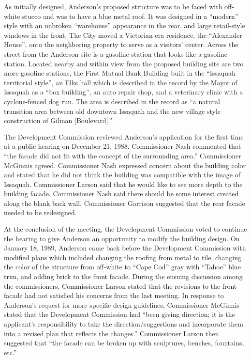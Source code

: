 As initially designed, Anderson's proposed structure was to be faced with
off-white stucco and was to have a blue metal roof. It was designed in a
``modern'' style with an unbroken ``warehouse'' appearance in the rear, and
large retail-style windows in the front. The City moved a Victorian era
residence, the ``Alexander House'', onto the neighboring property to serve as a
visitors' center. Across the street from the Anderson site is a gasoline station
that looks like a gasoline station. Located nearby and within view from the
proposed building site are two more gasoline stations, the First Mutual Bank
Building built in the ``Issaquah territorial style'', an Elks hall which is
described in the record by the Mayor of Issaquah as a ``box building'', an auto
repair shop, and a veterinary clinic with a cyclone-fenced dog run. The area is
described in the record as ``a natural transition area between old downtown
Issaquah and the new village style construction of Gilman [Boulevard].''

The Development Commission reviewed Anderson's application for the first time
at a public hearing on December 21, 1988. Commissioner Nash commented that ``the
facade did not fit with the concept of the surrounding area.'' Commissioner
McGinnis agreed. Commissioner Nash expressed concern about the building color
and stated that he did not think the building was compatible with the image of
Issaquah. Commissioner Larson said that he would like to see more depth to the
building facade. Commissioner Nash said there should be some interest created
along the blank back wall. Commissioner Garrison suggested that the rear facade
needed to be redesigned.

At the conclusion of the meeting, the Development Commission voted to continue
the hearing to give Anderson an opportunity to modify the building design. On
January 18, 1989, Anderson came back before the Development Commission with
modified plans which included changing the roofing from metal to tile, changing
the color of the structure from off-white to ``Cape Cod'' gray with
``Tahoe'' blue trim, and adding brick to the front facade. During the ensuing
discussion among the commissioners, Commissioner Larson stated that the
revisions to the front facade had not satisfied his concerns from the last
meeting. In response to Anderson's request for more specific design guidelines,
Commissioner McGinnis stated that the Development Commission had ``been giving
direction; it is the applicant's responsibility to take the
direction/suggestions and incorporate them into a revised plan that reflects the
changes.'' Commissioner Larson then suggested that ``the facade can be broken up
with sculptures, benches, fountains, etc.''

